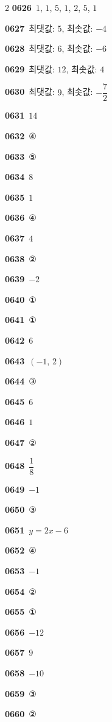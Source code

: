 \documentclass[10pt,a4paper]{article}
\begin{document}
\begin{multicols}{2}
\noindent\textbf{0626}\ $1$, $1$, $5$, $1$, $2$, $5$, $1$\par
\noindent\textbf{0627}\ 최댓값: $5$, 최솟값: $-4$\par
\noindent\textbf{0628}\ 최댓값: $6$, 최솟값: $-6$\par
\noindent\textbf{0629}\ 최댓값: $12$, 최솟값: $4$\par
\noindent\textbf{0630}\ 최댓값: $9$, 최솟값: $-\dfrac{7}{2}$\par
\noindent\textbf{0631}\ $14$\par
\noindent\textbf{0632}\ ④\par
\noindent\textbf{0633}\ ⑤\par
\noindent\textbf{0634}\ $8$\par
\noindent\textbf{0635}\ $1$\par
\noindent\textbf{0636}\ ④\par
\noindent\textbf{0637}\ $4$\par
\noindent\textbf{0638}\ ②\par
\noindent\textbf{0639}\ $-2$\par
\noindent\textbf{0640}\ ①\par
\noindent\textbf{0641}\ ①\par
\noindent\textbf{0642}\ $6$\par
\noindent\textbf{0643}\ $(-1,\,2)$\par
\noindent\textbf{0644}\ ③\par
\noindent\textbf{0645}\ $6$\par
\noindent\textbf{0646}\ $1$\par
\noindent\textbf{0647}\ ②\par
\noindent\textbf{0648}\ $\dfrac{1}{8}$\par
\noindent\textbf{0649}\ $-1$\par
\noindent\textbf{0650}\ ③\par
\noindent\textbf{0651}\ $y=2x-6$\par
\noindent\textbf{0652}\ ④\par
\noindent\textbf{0653}\ $-1$\par
\noindent\textbf{0654}\ ②\par
\noindent\textbf{0655}\ ①\par
\noindent\textbf{0656}\ $-12$\par
\noindent\textbf{0657}\ $9$\par
\noindent\textbf{0658}\ $-10$\par
\noindent\textbf{0659}\ ③\par
\noindent\textbf{0660}\ ②\par

\end{multicols}
\end{document}

